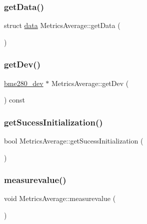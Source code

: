 \subsubsection{\texorpdfstring{get\+Data()}{getData()}}
{\footnotesize\ttfamily struct \hyperlink{structdata}{data} Metrics\+Average\+::get\+Data (\begin{DoxyParamCaption}{ }\end{DoxyParamCaption})}

\mbox{\label{class_metrics_average_ad476d4c4f04a3303d236dba4849c8045}} 
\subsubsection{\texorpdfstring{get\+Dev()}{getDev()}}
{\footnotesize\ttfamily \hyperlink{structbme280__dev}{bme280\+\_\+dev} $\ast$ Metrics\+Average\+::get\+Dev (\begin{DoxyParamCaption}{ }\end{DoxyParamCaption}) const}

\mbox{\label{class_metrics_average_a17fc55cc103b48439645e4cb48cd62d2}} 
\subsubsection{\texorpdfstring{get\+Sucess\+Initialization()}{getSucessInitialization()}}
{\footnotesize\ttfamily bool Metrics\+Average\+::get\+Sucess\+Initialization (\begin{DoxyParamCaption}{ }\end{DoxyParamCaption})}

\mbox{\label{class_metrics_average_ad7c1ebb802eb2b710fc823f82e4ecf7e}} 
\subsubsection{\texorpdfstring{measurevalue()}{measurevalue()}}
{\footnotesize\ttfamily void Metrics\+Average\+::measurevalue (\begin{DoxyParamCaption}{ }\end{DoxyParamCaption})}

